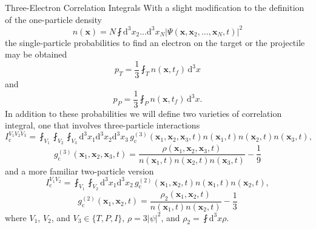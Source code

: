 \documentclass[letterpaper, 11 pt]{report}
\begin{document}
\begin{appendices}
\begin{chapter}{Three-Electron Correlation Integrals \label{chap:moreIc}}
      With a slight modification to the definition of the one-particle density
      \begin{equation} \label{eq:xDen}
         n(\mathbf{x}) = N \fint \mathrm{d}^3 x_2 \dots \mathrm{d}^3 x_N
            \left| \Psi( \mathbf{x}, \mathbf{x}_2, \dots, \mathbf{x}_N, t) \right|^2
      \end{equation}
      the single-particle probabilities to find an electron on the target or the projectile may be
      obtained
      \begin{equation}
         p_T = \frac{1}{3} \fint_T n(\mathbf{x},t_f) \, \mathrm{d}^3 x
      \end{equation}
      and
      \begin{equation}
         p_P = \frac{1}{3} \fint_P n(\mathbf{x},t_f) \, \mathrm{d}^3 x.
      \end{equation}
      In addition to these probabilities we will define two varieties of correlation integral, one that
      involves three-particle interactions
      \begin{equation}
         I_\mathrm{c}^{V_1 V_2 V_3} = \fint_{V_1} \fint_{V_2} \fint_{V_3}
           \mathrm{d}^3 x_1 \mathrm{d}^3 x_2 \mathrm{d}^3 x_3 \,
           g^{(3)}_\mathrm{c}(\mathbf{x}_1, \mathbf{x}_2, \mathbf{x}_3, t)
           n(\mathbf{x}_1,t) n(\mathbf{x}_2,t) n(\mathbf{x}_3,t),
      \end{equation}
      \begin{equation}
         g^{(3)}_\mathrm{c}(\mathbf{x}_1, \mathbf{x}_2, \mathbf{x}_3, t) =
            \frac{\rho(\mathbf{x}_1, \mathbf{x}_2, \mathbf{x}_3, t)}
            {n(\mathbf{x}_1,t) n(\mathbf{x}_2,t) n(\mathbf{x}_3,t)} - \frac{1}{9}
      \end{equation}
      and a more familiar two-particle version
      \begin{equation}
         I_\mathrm{c}^{V_1 V_2} = \fint_{V_1} \fint_{V_2} \mathrm{d}^3 x_1 \mathrm{d}^3 x_2 \,
         g^{(2)}_\mathrm{c}(\mathbf{x}_1, \mathbf{x}_2, t) n(\mathbf{x}_1,t) n(\mathbf{x}_2,t),
      \end{equation}
      \begin{equation}
         g^{(2)}_\mathrm{c}(\mathbf{x}_1, \mathbf{x}_2, t) =
         \frac{\rho_2(\mathbf{x}_1, \mathbf{x}_2, t)}
         {n(\mathbf{x}_1,t) n(\mathbf{x}_2,t) } - \frac{1}{3}
      \end{equation}
      where $V_1$, $V_2$, and $V_3 \in \{T,P,I\}$, $\rho = 3|\psi|^2$, and $\rho_2 =
      \fint \mathrm{d}^3 x \rho$.


\end{chapter}
\end{appendices}
\end{document}
